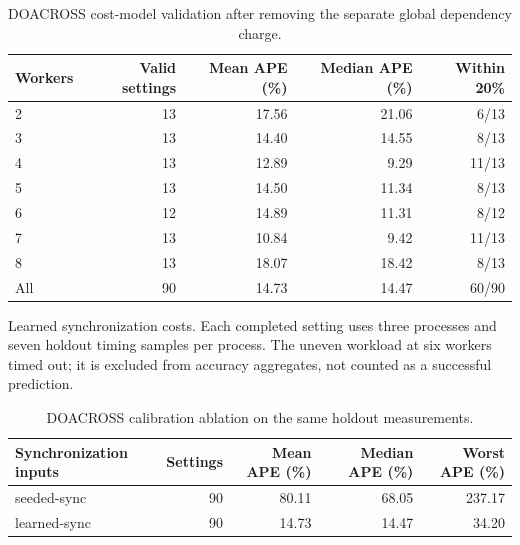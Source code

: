 \begin{table}[htbp]\centering
\small
\begin{tabular}{lrrrr}
\toprule
Workers & Valid settings & Mean APE (\%) & Median APE (\%) & Within 20\% \\
\midrule
2 & 13 & 17.56 & 21.06 & 6/13 \\
3 & 13 & 14.40 & 14.55 & 8/13 \\
4 & 13 & 12.89 & 9.29 & 11/13 \\
5 & 13 & 14.50 & 11.34 & 8/13 \\
6 & 12 & 14.89 & 11.31 & 8/12 \\
7 & 13 & 10.84 & 9.42 & 11/13 \\
8 & 13 & 18.07 & 18.42 & 8/13 \\
All & 90 & 14.73 & 14.47 & 60/90 \\
\bottomrule
\end{tabular}
\caption{DOACROSS cost-model validation after removing the separate global dependency charge.}\label{tab:doacross-summary}
\par\medskip\begin{minipage}{0.98\linewidth}\footnotesize Learned synchronization costs. Each completed setting uses three processes and seven holdout timing samples per process. The uneven workload at six workers timed out; it is excluded from accuracy aggregates, not counted as a successful prediction.\end{minipage}
\end{table}
\begin{table}[htbp]\centering
\small
\begin{tabular}{lrrrr}
\toprule
Synchronization inputs & Settings & Mean APE (\%) & Median APE (\%) & Worst APE (\%) \\
\midrule
seeded-sync & 90 & 80.11 & 68.05 & 237.17 \\
learned-sync & 90 & 14.73 & 14.47 & 34.20 \\
\bottomrule
\end{tabular}
\caption{DOACROSS calibration ablation on the same holdout measurements.}\label{tab:doacross-calibration}
\end{table}
